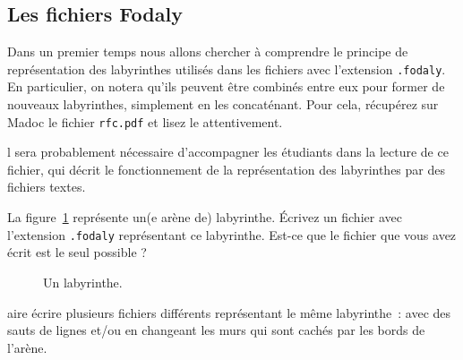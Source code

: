 \documentclass[a4paper]{article}
\newenvironment{enseignants}[1]{\noindent\color{blue}{\bf #1}}{}
\begin{document}
\subsection{Les fichiers Fodaly}

Dans un premier temps nous allons chercher à comprendre le principe de représentation des labyrinthes utilisés dans les fichiers avec l'extension \verb|.fodaly|.
En particulier, on notera qu'ils peuvent être combinés entre eux pour former de nouveaux labyrinthes, simplement en les concaténant.
Pour cela, récupérez sur Madoc le fichier \verb|rfc.pdf| et lisez le attentivement.

\begin{enseignants}
  Il sera probablement nécessaire d'accompagner les étudiants dans la lecture de ce fichier, qui décrit le fonctionnement de la représentation des labyrinthes par des fichiers textes.
\end{enseignants}

La figure~\ref{fig:alab} représente un(e arène de) labyrinthe.
Écrivez un fichier avec l'extension \verb|.fodaly| représentant ce labyrinthe.
Est-ce que le fichier que vous avez écrit est le seul possible ?

\begin{figure}[htbp]
  \centering
  \caption{Un labyrinthe.}\label{fig:alab}
\end{figure}

\begin{enseignants}
  Faire écrire plusieurs fichiers différents représentant le même labyrinthe~: avec des sauts de lignes et/ou en changeant les murs qui sont cachés par les bords de l'arène.
\end{enseignants}
\end{document}
